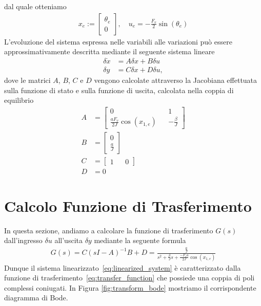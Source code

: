 \documentclass[a4paper, 11pt]{article}
\begin{document}
%
dal quale otteniamo
%
\begin{align*}
	x_e := \begin{bmatrix}
            \theta_e \\ 0
        \end{bmatrix},  \quad u_e = - \frac{F_v}{2}\sin{ (\theta_e) }
\end{align*}
%
L'evoluzione del sistema espressa nelle variabili alle variazioni pu\`o essere approssimativamente descritta mediante il seguente sistema lineare
%
\begin{subequations}
\begin{align}
	\delta \dot{x} &= A\delta x + B\delta u
	\\
	\delta y &= C\delta x + D\delta u,
\end{align}
\end{subequations}
%
dove le matrici $A$, $B$, $C$ e $D$ vengono calcolate attraverso la Jacobiana effettuata sulla funzione di stato e sulla funzione di uscita, calcolata nella coppia di equilibrio
%
\begin{align*}
	A &= \begin{bmatrix}
0 && 1
\\
\frac{aF_{v}}{2J}\cos{(x_{1,e})} && -\frac{\beta}{J}
\end{bmatrix}
	\\
	B &= \begin{bmatrix}
0
\\
\frac{a}{J} 
\end{bmatrix}
	\\
	C &= \begin{bmatrix}
1 && 0 \end{bmatrix}
	\\
	D &= 0
 \end{align*}
%
\section{Calcolo Funzione di Trasferimento}

In questa sezione, andiamo a calcolare la funzione di trasferimento $G(s)$ dall'ingresso $\delta u$ all'uscita $\delta y$ mediante la seguente formula 
%
%
\begin{align}\label{eq:transfer_function}
G(s) = C(sI-A)^{-1}B+D = \frac{\frac{a}{J}}{s^2 + \frac{\beta}{J} s + \frac{-F_v a}{2J}\cos{(x_{1,e})}}
\end{align}
%
Dunque il sistema linearizzato~\eqref{eq:linearized_system} è caratterizzato dalla funzione di trasferimento~\eqref{eq:transfer_function} che possiede una coppia di poli complessi coniugati. In Figura \ref{fig:transform_bode} mostriamo il corrispondente diagramma di Bode. 
\end{document}

